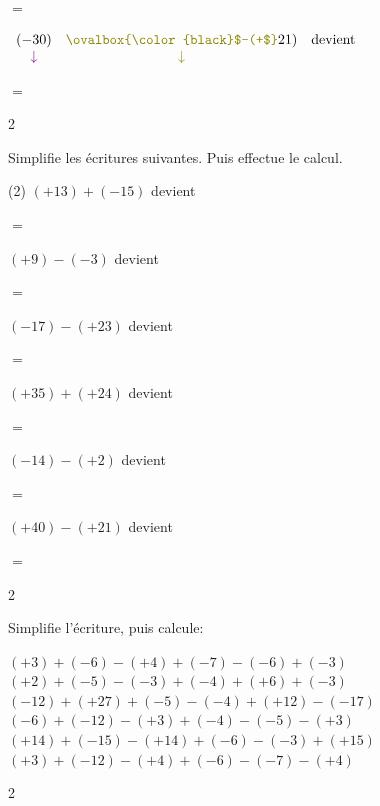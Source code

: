 \documentclass[a4paper,11pt]{report}
\begin{document}
\begin{exop}
{\begin{tasks}
\vspace*{.7cm} $=$

\task $\begin{array}{cccc}
(-30)&{\color{olive}\ovalbox{\color{black}$-(+$}}21)& \mbox{devient} \\
{\color{violet}\downarrow}&{\color{olive}\downarrow}& & \\
\end{array}$


\vspace*{.7cm} $=$

\end{tasks}

}{2}
\end{exop}


\begin{exop}
{Simplifie les écritures suivantes. Puis effectue le calcul.

\begin{tasks}(2)
\task $(+13)+(-15)$ devient

\vspace*{.7cm} $=$

\task $(+9)-(-3)$ devient

\vspace*{.7cm} $=$

\task $(-17)-(+23)$ devient

\vspace*{.7cm} $=$

\task $(+35)+(+24)$ devient

\vspace*{.7cm} $=$

\task $(-14)-(+2)$ devient

\vspace*{.7cm} $=$

\task $(+40)-(+21)$ devient

\vspace*{.7cm} $=$


\end{tasks}
}{2}
\end{exop}

\begin{exo}
{Simplifie l'écriture, puis calcule:

\begin{tasks}
\task $(+3)+(-6)-(+4)+(-7)-(-6)+(-3)$
\task $(+2)+(-5)-(-3)+(-4)+(+6)+(-3)$
\task $(-12)+(+27)+(-5)-(-4)+(+12)-(-17)$
\task $(-6)+(-12)-(+3)+(-4)-(-5)-(+3)$
\task $(+14)+(-15)-(+14)+(-6)-(-3)+(+15)$
\task $(+3)+(-12)-(+4)+(-6)-(-7)-(+4)$
\end{tasks}
}{2}
\end{exo}
\end{document}
